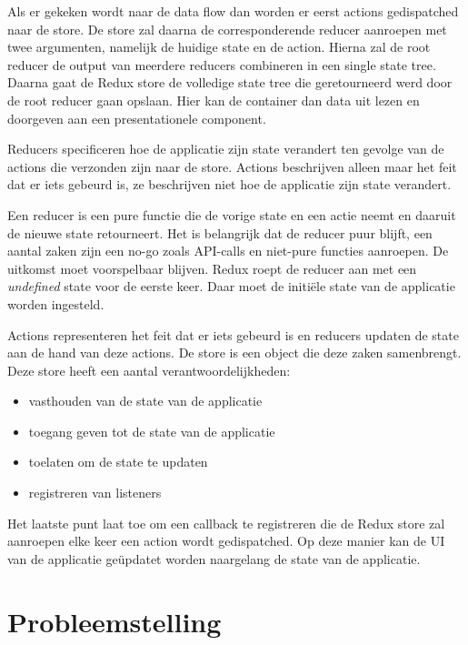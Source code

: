 Als er gekeken wordt naar de data flow dan worden er eerst actions gedispatched naar de store. De store zal daarna de corresponderende reducer aanroepen met twee argumenten, namelijk de huidige state en de action. Hierna zal de root reducer de output van meerdere reducers combineren in een single state tree. Daarna gaat de Redux store de volledige state tree die geretourneerd werd door de root reducer gaan opslaan. Hier kan de container dan data uit lezen en doorgeven aan een presentationele component.

Reducers specificeren hoe de applicatie zijn state verandert ten gevolge van de actions die verzonden zijn naar de store. Actions beschrijven alleen maar het feit dat er iets gebeurd is, ze beschrijven niet hoe de applicatie zijn state verandert.

Een reducer is een pure functie die de vorige state en een actie neemt en daaruit de nieuwe state retourneert. Het is belangrijk dat de reducer puur blijft, een aantal zaken zijn een no-go zoals API-calls en niet-pure functies aanroepen. De uitkomst moet voorspelbaar blijven. Redux roept de reducer aan met een \textit{undefined} state voor de eerste keer. Daar moet de initiële state van de applicatie worden ingesteld. \autocite{Redux02}

Actions representeren het feit dat er iets gebeurd is en reducers updaten de state aan de hand van deze actions. De store is een object die deze zaken samenbrengt. Deze store heeft een aantal verantwoordelijkheden: 
\begin{itemize}
	\item vasthouden van de state van de applicatie
	\item toegang geven tot de state van de applicatie
	\item toelaten om de state te updaten
	\item registreren van listeners
\end{itemize}
Het laatste punt laat toe om een callback te registreren die de Redux store zal aanroepen elke keer een action wordt gedispatched. Op deze manier kan de UI van de applicatie geüpdatet worden naargelang de state van de applicatie. 



\section{Probleemstelling}
\label{sec:probleemstelling}

